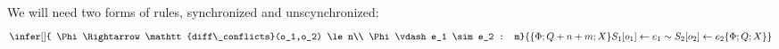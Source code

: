 We will need two forms of rules, synchronized and unscynchronized:
\[
\infer[]{ \Phi \Rightarrow \mathtt{diff\_conflicts}(o_1,o_2) \le n\\  \Phi \vdash e_1 \sim e_2 : m}{\{\Phi; Q+n+m; X\} S_1[o_1] \leftarrow e_1 \sim S_2[o_2] \leftarrow e_2 \{\Phi; Q; X\}  }
\]

